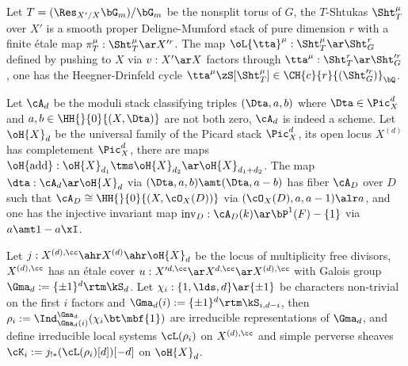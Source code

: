 \documentclass[article, a4paper, twoside]{universal}
\begin{document}

\begin{stp}
	Let $T=(\Res_{X'/X}\bG_{m})/\bG_{m}$ be the nonsplit torus of $G$, the $T$-Shtukas $\Sht_{T}^{\mu}$ over $X'$ is a smooth proper Deligne-Mumford stack of pure dimension $r$ with a finite {\'e}tale map $\pi_{T}^{\mu}:\Sht_{T}^{\mu}\ar X^{\prime r}$. The map $\oL{\tta}^{\mu}:\Sht_{T}^{\mu}\ar\Sht_{G}^{r}$ defined by pushing to $X$ via $v:X'\ar X$ factors through $\tta^{\mu}:\Sht_{T}^{r}\ar\Sht_{G}^{\prime r}$, one has the Heegner-Drinfeld cycle $\tta^{\mu}\zS[\Sht_{T}^{\mu}]\in\CH{c}{r}{(\Sht_{G}^{\prime r})}_{\bQ}$.

	 Let $\cA_{d}$ be the moduli stack classifying triples $(\Dta,a,b)$ where $\Dta\in\Pic_{X}^{d}$ and $a,b\in\HH{}{0}{(X,\Dta)}$ are not both zero, $\cA_{d}$ is indeed a scheme. Let $\oH{X}_{d}$ be the universal family of the Picard stack $\Pic_{X}^{d}$, its open locus $X^{(d)}$ has completement $\Pic_{X}^{d}$, there are maps $\oH{\mathrm{add}}:\oH{X}_{d_{1}}\tms\oH{X}_{d_{2}}\ar\oH{X}_{d_{1}+d_{2}}$. The map $\dta:\cA_{d}\ar\oH{X}_{d}$ via $(\Dta,a,b)\amt(\Dta,a-b)$ has fiber $\cA_{D}$ over $D$ such that $\cA_{D}\cong\HH{}{0}{(X,\cO_{X}(D))}$ via $(\cO_{X}(D),a,a-1)\alr a$, and one has the injective invariant map $\mathrm{inv}_{D}:\cA_{D}(k)\ar\bP^{1}(F)-\{1\}$ via $a\amt1-a\xI$.

	Let $j:X^{(d),\cc}\ahr X^{(d)}\ahr \oH{X}_{d}$ be the locus of multiplicity free divisors, $X^{(d),\cc}$ has an {\'e}tale cover $u:X^{\prime d,\cc}\ar X^{d,\cc}\ar X^{(d),\cc}$ with Galois group $\Gma_{d}:=\{\pm1\}^{d}\rtm \kS_{d}$. Let $\chi_{i}:\{1,\lds,d\}\ar\{\pm1\}$ be characters non-trivial on the first $i$ factors and $\Gma_{d}(i):=\{\pm1\}^{d}\rtm\kS_{i,d-i}$, then $\rho_{i}:=\Ind_{\Gma_{d}(i)}^{\Gma_{d}}(\chi_{i}\bt\mbf{1})$ are irreducible representations of $\Gma_{d}$, and define irreducible local systems $\cL(\rho_{i})$ on $X^{(d),\cc}$ and simple perverse sheaves $\cK_{i}:=j_{!*}(\cL(\rho_{i})[d])[-d]$ on $\oH{X}_{d}$.


\end{stp}
\end{document}
